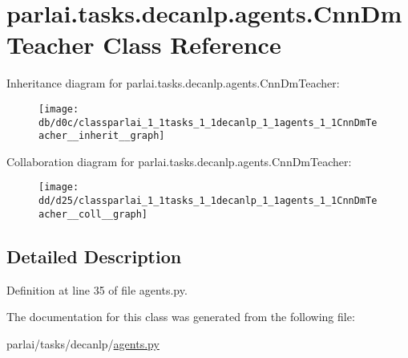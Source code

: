 \hypertarget{classparlai_1_1tasks_1_1decanlp_1_1agents_1_1CnnDmTeacher}{}\section{parlai.\+tasks.\+decanlp.\+agents.\+Cnn\+Dm\+Teacher Class Reference}
\label{classparlai_1_1tasks_1_1decanlp_1_1agents_1_1CnnDmTeacher}


Inheritance diagram for parlai.\+tasks.\+decanlp.\+agents.\+Cnn\+Dm\+Teacher\+:
\nopagebreak
\begin{figure}[H]
\begin{center}
\leavevmode
\texttt{[image: db/d0c/classparlai\_1\_1tasks\_1\_1decanlp\_1\_1agents\_1\_1CnnDmTeacher\_\_inherit\_\_graph]}
\end{center}
\end{figure}


Collaboration diagram for parlai.\+tasks.\+decanlp.\+agents.\+Cnn\+Dm\+Teacher\+:
\nopagebreak
\begin{figure}[H]
\begin{center}
\leavevmode
\texttt{[image: dd/d25/classparlai\_1\_1tasks\_1\_1decanlp\_1\_1agents\_1\_1CnnDmTeacher\_\_coll\_\_graph]}
\end{center}
\end{figure}


\subsection{Detailed Description}


Definition at line 35 of file agents.\+py.



The documentation for this class was generated from the following file\+:\begin{DoxyCompactItemize}
\item 
parlai/tasks/decanlp/\hyperlink{parlai_2tasks_2decanlp_2agents_8py}{agents.\+py}\end{DoxyCompactItemize}
